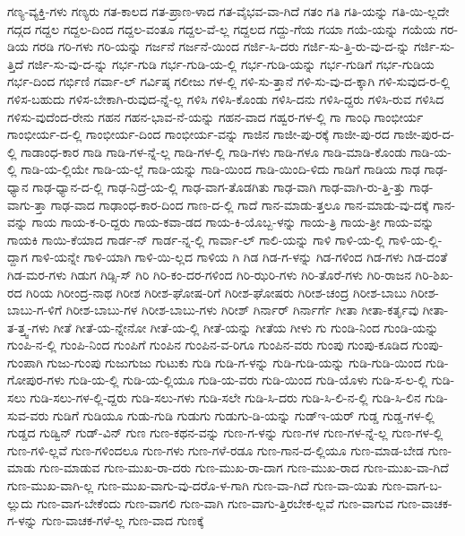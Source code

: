 {ಗಣ್ಯ-ವ್ಯಕ್ತಿ-ಗಳು
ಗಣ್ಯರು
ಗತ-ಕಾಲದ
ಗತ-ಪ್ರಾಣ-ಳಾದ
ಗತ-ವೈಭವ-ವಾ-ಗಿದೆ
ಗತಂ
ಗತಿ
ಗತಿ-ಯನ್ನು
ಗತಿ-ಯಿ-ಲ್ಲದೇ
ಗದ್ಗದ
ಗದ್ದಲ
ಗದ್ದಲ-ದಿಂದ
ಗದ್ದಲ-ವಂತೂ
ಗದ್ದಲ-ವೆ-ಲ್ಲ
ಗದ್ದಲದ
ಗದ್ದು-ಗೆಯ
ಗಯಾ
ಗಯೆ-ಯನ್ನು
ಗಯೆಯ
ಗರ-ಡಿಯ
ಗರಡಿ
ಗರಿ-ಗಳು
ಗರಿ-ಯನ್ನು
ಗರ್ಜನೆ
ಗರ್ಜನೆ-ಯಿಂದ
ಗರ್ಜಿ-ಸಿ-ದರು
ಗರ್ಜಿ-ಸು-ತ್ತಿ-ರು-ವು-ದ-ನ್ನು
ಗರ್ಜಿ-ಸು-ತ್ತಿದೆ
ಗರ್ಜಿ-ಸು-ವು-ದ-ನ್ನು
ಗರ್ಭ-ಗುಡಿ
ಗರ್ಭ-ಗುಡಿ-ಯ-ಲ್ಲಿ
ಗರ್ಭ-ಗುಡಿ-ಯನ್ನು
ಗರ್ಭ-ಗುಡಿಗೆ
ಗರ್ಭ-ಗುಡಿಯ
ಗರ್ಭ-ದಿಂದ
ಗರ್ಭಿಣಿ
ಗರ್ವಾ-ಲ್
ಗರ್ವಿಷ್ಠ
ಗಲೀಜು
ಗಳ-ಲ್ಲಿ
ಗಳಿ-ಸು-ತ್ತಾನೆ
ಗಳಿ-ಸು-ವು-ದ-ಕ್ಕಾಗಿ
ಗಳಿ-ಸುವುದ-ರ-ಲ್ಲಿ
ಗಳಿಸ-ಬಹುದು
ಗಳಿಸ-ಬೇಕಾಗಿ-ರುವುದ-ನ್ನೆ-ಲ್ಲ
ಗಳಿಸಿ
ಗಳಿಸಿ-ಕೊಂಡು
ಗಳಿಸಿ-ದನು
ಗಳಿಸಿ-ದ್ದರು
ಗಳಿಸಿ-ರುವ
ಗಳಿಸಿದ
ಗಳಿಸು-ವುದೆಂದ-ರೇನು
ಗಹನ
ಗಹನ-ಭಾವ-ನೆ-ಯನ್ನು
ಗಹನ-ವಾದ
ಗಹ್ವರ-ಗಳ-ಲ್ಲಿ
ಗಾ
ಗಾಂಧಿ
ಗಾಂಭೀರ್ಯ
ಗಾಂಭೀರ್ಯ-ದ-ಲ್ಲಿ
ಗಾಂಭೀರ್ಯ-ದಿಂದ
ಗಾಂಭೀರ್ಯ-ವನ್ನು
ಗಾಜಿನ
ಗಾಜೀ-ಪು-ರಕ್ಕೆ
ಗಾಜೀ-ಪು-ರದ
ಗಾಜೀ-ಪುರ-ದ-ಲ್ಲಿ
ಗಾಡಾಂಧ-ಕಾರ
ಗಾಡಿ
ಗಾಡಿ-ಗಳ-ನ್ನೆ-ಲ್ಲ
ಗಾಡಿ-ಗಳ-ಲ್ಲಿ
ಗಾಡಿ-ಗಳು
ಗಾಡಿ-ಗಳೂ
ಗಾಡಿ-ಮಾಡಿ-ಕೊಂಡು
ಗಾಡಿ-ಯ-ಲ್ಲಿ
ಗಾಡಿ-ಯ-ಲ್ಲಿಯೇ
ಗಾಡಿ-ಯ-ಲ್ಲೆ
ಗಾಡಿ-ಯನ್ನು
ಗಾಡಿ-ಯಿಂದ
ಗಾಡಿ-ಯಿಂದಿ-ಳಿದು
ಗಾಡಿಗೆ
ಗಾಡಿಯ
ಗಾಢ
ಗಾಢ-ಧ್ಯಾನ
ಗಾಢ-ಧ್ಯಾನ-ದ-ಲ್ಲಿ
ಗಾಢ-ನಿದ್ರೆ-ಯ-ಲ್ಲಿ
ಗಾಢ-ವಾಗ-ತೊಡಗಿತು
ಗಾಢ-ವಾಗಿ
ಗಾಢ-ವಾಗಿ-ರು-ತ್ತಿ-ತ್ತು
ಗಾಢ-ವಾಗು-ತ್ತಾ
ಗಾಢ-ವಾದ
ಗಾಢಾಂಧ-ಕಾರ-ದಿಂದ
ಗಾಣ-ದ-ಲ್ಲಿ
ಗಾದೆ
ಗಾನ-ಮಾಡು-ತ್ತಲೂ
ಗಾನ-ಮಾಡು-ವು-ದಕ್ಕೆ
ಗಾನ-ವನ್ನು
ಗಾಯ
ಗಾಯ-ಕ-ರಿ-ದ್ದರು
ಗಾಯ-ಕವಾ-ಡದ
ಗಾಯ-ಕಿ-ಯೊಬ್ಬ-ಳನ್ನು
ಗಾಯ-ತ್ರಿ
ಗಾಯ-ತ್ರೀ
ಗಾಯ-ವನ್ನು
ಗಾಯಕಿ
ಗಾಯಿ-ಕೆಯಾದ
ಗಾರ್ಡ-ನ್
ಗಾರ್ಡ-ನ್ನ-ಲ್ಲಿ
ಗಾರ್ವಾ-ಲ್
ಗಾಲಿ-ಯನ್ನು
ಗಾಳಿ
ಗಾಳಿ-ಯ-ಲ್ಲಿ
ಗಾಳಿ-ಯ-ಲ್ಲಿ-ದ್ದಾಗ
ಗಾಳಿ-ಯನ್ನೇ
ಗಾಳಿ-ಯಾಗಿ
ಗಾಳಿ-ಯಿ-ಲ್ಲದ
ಗಾಳಿಯ
ಗಿ
ಗಿಡ
ಗಿಡ-ಗ-ಳನ್ನು
ಗಿಡ-ಗಳಿಂದ
ಗಿಡ-ಗಳು
ಗಿಡ-ದಂತೆ
ಗಿಡ-ಮರ-ಗಳು
ಗಿಡುಗ
ಗಿಡ್ಸಿ-ಸ್
ಗಿರಿ
ಗಿರಿ-ಕಂ-ದರ-ಗಳಿಂದ
ಗಿರಿ-ಝರಿ-ಗಳು
ಗಿರಿ-ತೊರೆ-ಗಳು
ಗಿರಿ-ರಾಜನ
ಗಿರಿ-ಶಿಖ-ರದ
ಗಿರಿಯ
ಗಿರೀಂದ್ರ-ನಾಥ
ಗಿರೀಶ
ಗಿರೀಶ-ಘೋಷ-ರಿಗೆ
ಗಿರೀಶ-ಘೋಷರು
ಗಿರೀಶ-ಚಂದ್ರ
ಗಿರೀಶ-ಬಾಬು
ಗಿರೀಶ-ಬಾಬು-ಗ-ಳಿಗೆ
ಗಿರೀಶ-ಬಾಬು-ಗಳ
ಗಿರೀಶ-ಬಾಬು-ಗಳು
ಗಿರೀಶ್
ಗಿರ್ನಾರ್
ಗಿರ್ನಾರ್ಗೆ
ಗೀತಾ
ಗೀತಾ-ಕರ್ತೃವು
ಗೀತಾ-ತ-ತ್ತ್ವ-ಗಳು
ಗೀತೆ
ಗೀತೆ-ಯ-ನ್ನೇನೋ
ಗೀತೆ-ಯ-ಲ್ಲಿ
ಗೀತೆ-ಯನ್ನು
ಗೀತೆಯ
ಗೀಳು
ಗು
ಗುಂಡಿ-ನಿಂದ
ಗುಂಡಿ-ಯನ್ನು
ಗುಂಪಿ-ನ-ಲ್ಲಿ
ಗುಂಪಿ-ನಿಂದ
ಗುಂಪಿಗೆ
ಗುಂಪಿನ
ಗುಂಪಿನ-ವ-ರಿಗೂ
ಗುಂಪಿನ-ವರು
ಗುಂಪು
ಗುಂಪು-ಕೂಡಿದ
ಗುಂಪು-ಗುಂಪಾಗಿ
ಗುಜು-ಗುಂಪು
ಗುಜುಗುಜು
ಗುಟುಕು
ಗುಡಿ
ಗುಡಿ-ಗ-ಳನ್ನು
ಗುಡಿ-ಗುಡಿ-ಯನ್ನು
ಗುಡಿ-ಗುಡಿ-ಯಿಂದ
ಗುಡಿ-ಗೋಪುರ-ಗಳು
ಗುಡಿ-ಯ-ಲ್ಲಿ
ಗುಡಿ-ಯ-ಲ್ಲಿಯೂ
ಗುಡಿ-ಯ-ವರು
ಗುಡಿ-ಯಿಂದ
ಗುಡಿ-ಯೊಳು
ಗುಡಿ-ಸ-ಲ-ಲ್ಲಿ
ಗುಡಿ-ಸಲು
ಗುಡಿ-ಸಲು-ಗಳ-ಲ್ಲಿ-ದ್ದರು
ಗುಡಿ-ಸಲು-ಗಳು
ಗುಡಿ-ಸಲೇ
ಗುಡಿ-ಸಿ-ದರು
ಗುಡಿ-ಸಿ-ಲಿ-ನ-ಲ್ಲಿ
ಗುಡಿ-ಸಿ-ಲಿನ
ಗುಡಿ-ಸುವ-ವರು
ಗುಡಿಗೆ
ಗುಡಿಯೂ
ಗುಡು-ಗುಡಿ
ಗುಡುಗು
ಗುಡುಗು-ಡಿ-ಯನ್ನು
ಗುಡ್ಇ-ಯರ್
ಗುಡ್ಡ
ಗುಡ್ಡ-ಗಳ-ಲ್ಲಿ
ಗುಡ್ಡದ
ಗುಡ್ವಿನ್
ಗುಡ್-ವಿನ್
ಗುಣ
ಗುಣ-ಕಥನ-ವನ್ನು
ಗುಣ-ಗ-ಳನ್ನು
ಗುಣ-ಗಳ
ಗುಣ-ಗಳ-ನ್ನೆ-ಲ್ಲ
ಗುಣ-ಗಳ-ಲ್ಲಿ
ಗುಣ-ಗಳಿ-ಲ್ಲವೆ
ಗುಣ-ಗಳಿಂದಲೂ
ಗುಣ-ಗಳು
ಗುಣ-ಗಳೆ-ರಡೂ
ಗುಣ-ಗಾನ-ದ-ಲ್ಲಿಯೂ
ಗುಣ-ಮಾಡ-ಬೇಡ
ಗುಣ-ಮಾಡು
ಗುಣ-ಮಾಡುವ
ಗುಣ-ಮುಖ-ರಾ-ದರು
ಗುಣ-ಮುಖ-ರಾ-ದಾಗ
ಗುಣ-ಮುಖ-ರಾದ
ಗುಣ-ಮುಖ-ವಾ-ಗಿದೆ
ಗುಣ-ಮುಖ-ವಾಗಿ-ಲ್ಲ
ಗುಣ-ಮುಖ-ವಾಗು-ವು-ದರೊ-ಳ-ಗಾಗಿ
ಗುಣ-ವಾ-ಗಿದೆ
ಗುಣ-ವಾ-ಯಿತು
ಗುಣ-ವಾಗ-ಬ-ಲ್ಲುದು
ಗುಣ-ವಾಗ-ಬೇಕೆಂದು
ಗುಣ-ವಾಗಲಿ
ಗುಣ-ವಾಗಿ
ಗುಣ-ವಾಗು-ತ್ತಿರಬೇಕ-ಲ್ಲವೆ
ಗುಣ-ವಾಗುವ
ಗುಣ-ವಾಚಕ-ಗ-ಳನ್ನು
ಗುಣ-ವಾಚಕ-ಗಳೆ-ಲ್ಲ
ಗುಣ-ವಾದ
ಗುಣಕ್ಕೆ
}
